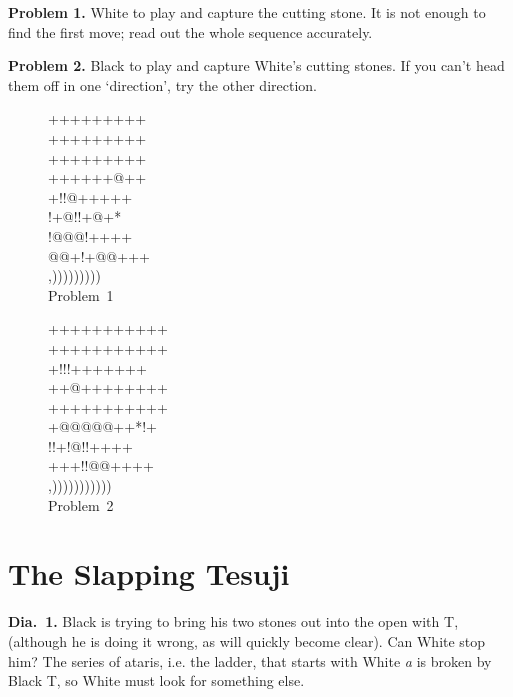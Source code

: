 \documentclass[mcrownvopaper,10pt,oneside,onecolumn,draft,showtrims]{memoir}
\begin{document}
\noindent
\textbf{Problem 1.} White to play and capture the cutting stone. It is not enough
to find the first move; read out the whole sequence accurately.

\noindent
\textbf{Problem 2.} Black to play and capture White's cutting stones. If you can't
head them off in one `direction', try the other direction.
\begin{figure}[ht]
    \begin{minipage}[c]{0.5\linewidth}
        \centering    
        {\gnos%
        +++++++++\\
        +++++++++\\
        +++++++++\\
        ++++++@++\\
        +!!@+++++\\
        !+@!!+@+*\\
        !@@@!++++\\
        @@+!+@@+++\\
        ,)))))))))\\
        }
        Problem\ 1
    \end{minipage}%
    \begin{minipage}[c]{0.5\linewidth}
        \centering    
        {\gnos%
        +++++++++++\\
        +++++++++++\\
        +!!!+++++++\\
        ++@++++++++\\
        +++++++++++\\
        +@@@@@++*!+\\
        !!+!@!!++++\\
        +++!!@@++++\\
        ,)))))))))))\\
        }
        Problem\ 2
    \end{minipage}%
\end{figure}

\section{The Slapping Tesuji}
\noindent
\textbf{Dia.\ 1.} Black is trying to bring his two stones out into the open with {\gnos T},
(although he is doing it wrong, as will quickly become clear). Can
White stop him? The series of ataris, i.e. the ladder, that starts with
White \textit{a} is broken by Black {\gnos T}, so White must look for something else.
\end{document}

